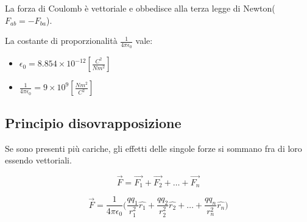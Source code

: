 La forza di Coulomb è vettoriale e obbedisce alla terza legge di Newton($F_{ab} = -F_{ba}$).

La costante di proporzionalità $\frac{1}{4\pi \epsilon_0}$ vale:
\begin{itemize}
    \item $\epsilon_0 = 8.854\times 10^{-12} [\frac{C^2}{N m^2}]$
    \item $\frac{1}{4\pi \epsilon_0} = 9\times 10^{9} [\frac{Nm^2}{C^2}]$
\end{itemize}

\subsection{Principio disovrapposizione}
Se sono presenti più cariche, gli effetti delle singole forze si sommano fra di  loro essendo vettoriali.

\begin{equation}
    \vec{F} = \vec{F_1} + \vec{F_2} + \dots + \vec{F_n}
\end{equation}

\begin{equation}
    \vec{F} = \frac{1}{4\pi \epsilon_0}\Big(\frac{qq_1}{r^2_1}\hat{r_1} + \frac{qq_2}{r^2_2}\hat{r_2} + \dots + \frac{qq_n}{r^2_n}\hat{r_n}\Big)
\end{equation}